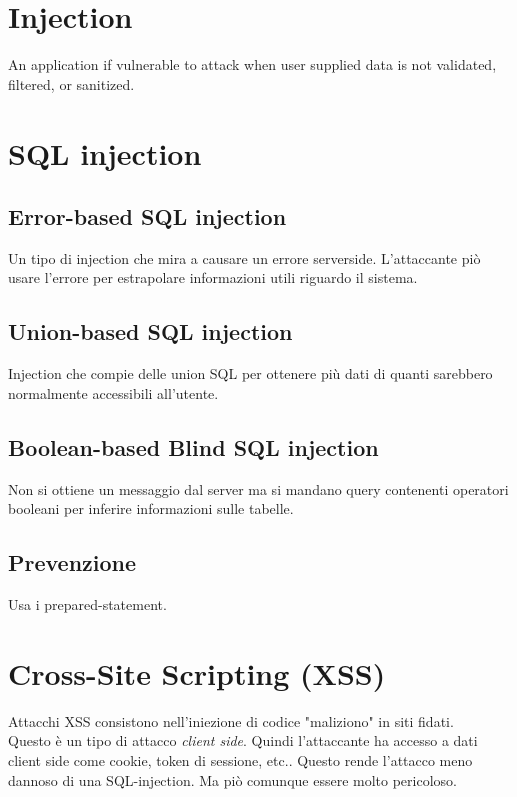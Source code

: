 \documentclass{article}
\begin{document}
\section{Injection}
An application if vulnerable to attack when user supplied data is not validated, filtered, or sanitized.

\section{SQL injection}
\subsection{Error-based SQL injection}
Un tipo di injection che mira a causare un errore serverside. L'attaccante piò usare l'errore per estrapolare informazioni utili riguardo il sistema.

\subsection{Union-based SQL injection}
Injection che compie delle union SQL per ottenere più dati di quanti sarebbero normalmente accessibili all'utente.

\subsection{Boolean-based Blind SQL injection}
Non si ottiene un messaggio dal server ma si mandano query contenenti operatori booleani per inferire informazioni sulle tabelle.

\subsection{Prevenzione}
Usa i prepared-statement.

\section{Cross-Site Scripting (XSS)}
Attacchi XSS consistono nell'iniezione di codice "maliziono" in siti fidati. \\
Questo è un tipo di attacco \textit{client side}. Quindi l'attaccante ha accesso a dati client side come cookie, token di sessione, etc..
Questo rende l'attacco meno dannoso di una SQL-injection. Ma piò comunque essere molto pericoloso.

\end{document}
